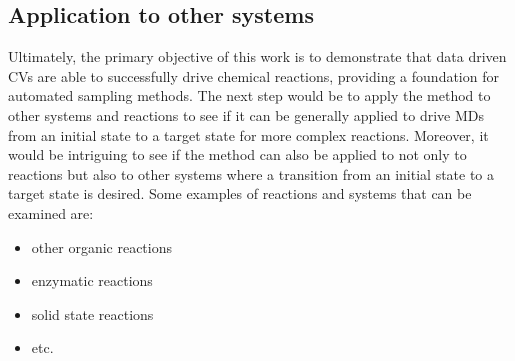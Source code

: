\subsection{Application to other systems}
Ultimately, the primary objective of this work is to demonstrate that data driven CVs are able to successfully drive chemical reactions, providing a foundation for automated sampling methods.
The next step would be to apply the method to other systems and reactions to see if it can be generally applied to 
drive MDs from an initial state to a target state for more complex reactions.
Moreover, it would be intriguing to see if the method can also be applied to not only to reactions but also to other systems where a transition from an initial state to a target state is desired.
Some examples of reactions and systems that can be examined are:
\begin{itemize}
    \item other organic reactions
    \item enzymatic reactions
    \item solid state reactions
    \item etc.
\end{itemize}
